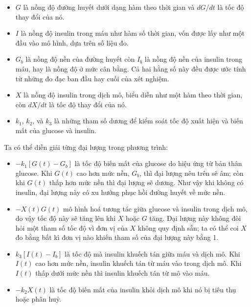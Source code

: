 \documentclass[12pt, openany]{book}
\theoremstyle{exercise}
\begin{document}
\begin{itemize}

\item $G$ là nồng độ đường huyết dưới dạng hàm theo thời gian và $dG/dt$ là tốc độ thay đổi của nó.

\item $I$ là nồng độ insulin trong máu như hàm số thời gian, vốn được lấy như một đầu vào mô hình, dựa trên số liệu đo.

\item $G_b$ là nồng độ nền của đường huyết còn $I_b$ là nồng độ nền của insulin trong máu, hay là nồng độ ở mức cân bằng. Cả hai hằng số này đều được ước tính từ những đo đạc ban đầu hay cuối của xét nghiệm.

\item $X$ là nồng độ insulin trong dịch mô, biểu diễn như một hàm theo thời gian, còn $dX/dt$ là tốc độ thay đổi của nó.

\item $k_1$, $k_2$, và $k_3$ là những tham số dương để kiểm soát tốc độ xuất hiện và biến mất của glucose và insulin. 

\end{itemize}

Ta có thể diễn giải từng đại lượng trong phương trình:

\begin{itemize}

\item $-k_1 \left[ G(t) - G_b \right]$ là tốc độ biến mất của glucose do hiệu ứng từ bản thân glucose.  Khi $G(t)$ cao hơn mức nền, $G_b$, thì đại lượng nêu trên sẽ âm; còn khi $G(t)$ thấp hơn mức nền thì đại lượng sẽ dương. Như vậy khi không có insulin, đại lượng này có xu hướng phục hồi đường huyết về mức nền.

\item $-X(t) G(t)$ mô hình hoá tương tác giữa glucose và insulin trong dịch mô, do vậy tốc độ này sẽ tăng lên khi $X$ hoặc $G$ tăng. Đại lượng này không đòi hỏi một tham số tốc độ vì đơn vị của $X$ không quy định sẵn; ta có thể coi $X$ đo bằng bất kì đơn vị nào khiến tham số của đại lượng này bằng 1.

\item $k_3 \left[ I(t) - I_b \right]$ là tốc độ mà insulin khuếch tán giữa máu và dịch mô. Khi $I(t)$ cao hơn mức nền, insulin khuếch tán từ máu vào trong dịch mô. Khi $I(t)$ thấp dưới mức nền thì insulin khuếch tán từ mô vào máu.

\item $-k_2 X(t)$ là tốc độ biến mất của insulin khỏi dịch mô khi nó bị tiêu thụ hoặc phân huỷ.

\end{itemize}
\end{document}
